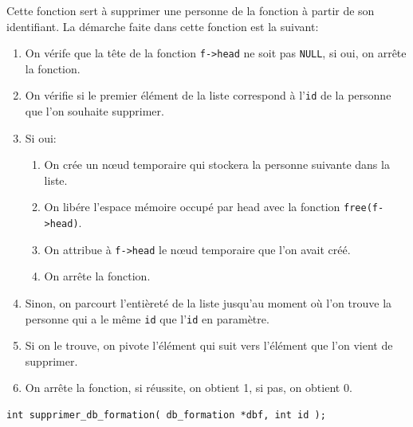 \documentclass[11pt]{article}
\begin{document}
Cette fonction sert à supprimer une personne de la fonction à partir de son identifiant. La démarche faite dans cette fonction est la suivant:
\begin{enumerate}
\item On vérife que la tête de la fonction \texttt{f->head} ne soit pas \texttt{NULL}, si oui, on arrête la fonction.
\item On vérifie si le premier élément de la liste correspond à l'\texttt{id} de la personne que l'on souhaite supprimer.
\item Si oui:
  \begin{enumerate}
  \item On crée un n\oe{}ud temporaire qui stockera la personne suivante dans la liste.
  \item On libére l'espace mémoire occupé par head avec la fonction \texttt{free(f->head)}.
  \item On attribue à \texttt{f->head} le n\oe{}ud temporaire que l'on avait créé.
  \item On arrête la fonction.
  \end{enumerate}
\item Sinon, on parcourt l'entièreté de la liste jusqu'au moment où l'on trouve la personne qui a le même \texttt{id} que l'\texttt{id} en paramètre.
\item Si on le trouve, on pivote l'élément qui suit vers l'élément que l'on vient de supprimer.
\item On arrête la fonction, si réussite, on obtient 1, si pas, on obtient 0.
\end{enumerate}

\begin{lstlisting}[firstnumber=490]
  int supprimer_db_formation( db_formation *dbf, int id );
\end{lstlisting}
\end{document}
